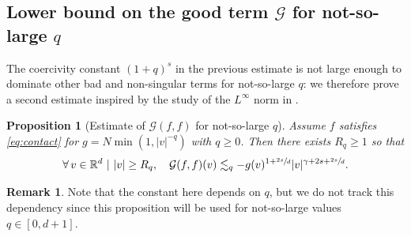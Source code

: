 \documentclass[11pt]{article}
\theoremstyle{plain}
\newtheorem{prop}[thm]{Proposition}
\theoremstyle{definition}
\newtheorem{remark}[thm]{Remark}
\numberwithin{equation}{section}
\newcommand{\R}{\mathbb R}
\let\A N
\begin{document}
\subsection{Lower bound on the good term $\mathcal{G}$ for
not-so-large $q$}

The coercivity constant $(1+q)^s$ in the previous estimate is not
large enough to dominate other bad and non-singular terms for
not-so-large $q$: we therefore prove a second estimate inspired by the
study of the $L^\infty$ norm in \cite{luis}.

\begin{prop}[Estimate of {$\mathcal{G} (f,f)$} for not-so-large
$q$] \label{prop:G} Assume $f$ satisfies \eqref{eq:contact} for
$g = \A \min(1,|v|^{-q})$ with $q \ge 0$. Then there exists
$R_q \geq 1$ so that
\[ \forall \, v \in \R^d \ | \ |v| \ge R_q, \quad \mathcal{G}
(f,f)(v) \lesssim_q - g(v)^{1+\sfrac{2s}d}
|v|^{\gamma+2s+\sfrac{2s}d}.
\]
\end{prop}
\begin{remark}
Note that the constant here depends on $q$, but we do not track this
dependency since this proposition will be used for not-so-large
values $q \in [0,d+1]$.
\end{remark}
\end{document}
